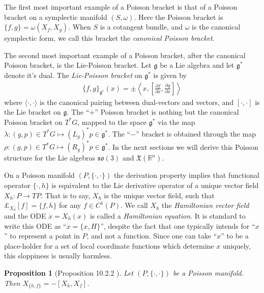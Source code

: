 \documentclass[12pt]{amsart}
\newcommand{\pder}[2]{\ensuremath{\frac{\partial #1}{\partial #2}}}
\newcommand{\so}{\ensuremath{\mathfrak{so}}}
\newtheorem{prop}[thm]{Proposition}
\begin{document}
The first most important example of a Poisson bracket is
that of a Poisson bracket on a symplectic manifold $(S,\omega)$.
Here the Poisson bracket is $\{ f , g \} = \omega( X_f , X_g )$.
When $S$ is a cotangent bundle, and $\omega$ is the canonical
symplectic form, we call this bracket the \emph{canonical Poisson
bracket}.

The second most important example of a Poisson bracket,
after the canonical Poisson bracket,
is the Lie-Poisson bracket.  Let $\mathfrak{g}$ be a Lie algebra
and let $\mathfrak{g}^*$ denote it's dual.
The \emph{Lie-Poisson bracket} on $\mathfrak{g}^*$ is given 
by
\begin{align}
  \{ f , g \}_{\mathfrak{g}^*}( x ) = \pm
  \left \langle x , \left[ \pder{f}{x} , \pder{g}{x} \right] \right \rangle
  \label{eq:Lie-Poisson}
\end{align}
where $\langle \cdot , \cdot \rangle$ is the canonical pairing between
dual-vectors and vectors, and $[ \cdot , \cdot ]$ is the Lie bracket
on $\mathfrak{g}$.
The ``$+$'' Poisson bracket is nothing but the canonical Poisson bracket on $T^*G$,
mapped to the space $\mathfrak{g}^*$ via the map $\lambda: (g,p) \in T^*G \mapsto (L_g)^*p \in \mathfrak{g}^*$.
The ``$-$'' bracket is obtained through the map
$\rho:(g,p) \in T^*G \mapsto (R_g)^*p \in \mathfrak{g}^*$.
In the next sections we will derive this Poisson structure for the 
Lie algebras $\so(3)$ and $\mathfrak{X}(\mathbb{R}^n)$.


On a Poisson manifold $(P,\{ \cdot , \cdot \})$
the derivation property implies that functional operator
$\{ \cdot , h \}$ is equivalent
to the Lie derivative operator of a unique vector field $X_h:P \to TP$.
That is to say, $X_h$ is the unique vector field, such that $\pounds_{X_h}[f] = \{ f , h \}$ for any $f \in C^1(P)$.
We call $X_h$ the \emph{Hamiltonian vector field} and the ODE $\dot{x} = X_h(x)$ is called a \emph{Hamiltonian equation}.
It is standard to write this ODE as ``$\dot{x} = \{ x , H\}$'',
despite the fact that one typically intends for ``$x$'' to represent
a point in $P$, and not a function.
Since one can take ``$x$'' to be a place-holder for a set of
local coordinate functions which determine $x$ uniquely, this
sloppiness is usually harmless.

\begin{prop}[Proposition 10.2.2 \cite{MandS}] \label{prop:Lie_hom}
  Let $(P,\{ \cdot , \cdot \})$ be a Poisson manifold.
  Then $X_{ \{ h ,f \} } = - [X_h , X_f ]$.
\end{prop}
\end{document}
